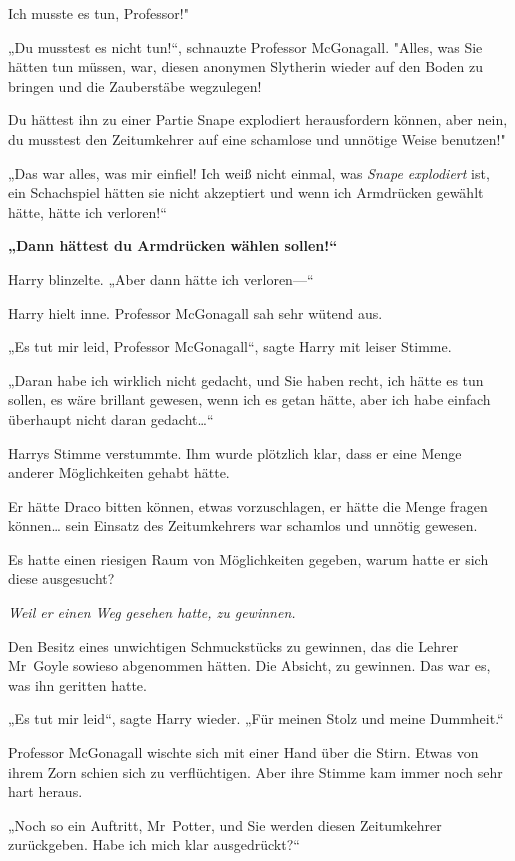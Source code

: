 {Ich musste es tun, Professor!"

„Du musstest es nicht tun!“, schnauzte Professor McGonagall. "Alles, was Sie hätten tun müssen, war, diesen anonymen Slytherin wieder auf den Boden zu bringen und die Zauberstäbe wegzulegen!

Du hättest ihn zu einer Partie Snape explodiert herausfordern können, aber nein, du musstest den Zeitumkehrer auf eine schamlose und unnötige Weise benutzen!"

„Das war alles, was mir einfiel! Ich weiß nicht einmal, was \emph{Snape explodiert} ist, ein Schachspiel hätten sie nicht akzeptiert und wenn ich Armdrücken gewählt hätte, hätte ich verloren!“

\textbf{„Dann hättest du Armdrücken wählen sollen!“}

Harry blinzelte. „Aber dann hätte ich verloren—“

Harry hielt inne. Professor McGonagall sah sehr wütend aus.

„Es tut mir leid, Professor McGonagall“, sagte Harry mit leiser Stimme.

„Daran habe ich wirklich nicht gedacht, und Sie haben recht, ich hätte es tun sollen, es wäre brillant gewesen, wenn ich es getan hätte, aber ich habe einfach überhaupt nicht daran gedacht…“

Harrys Stimme verstummte. Ihm wurde plötzlich klar, dass er eine Menge anderer Möglichkeiten gehabt hätte.

Er hätte Draco bitten können, etwas vorzuschlagen, er hätte die Menge fragen können… sein Einsatz des Zeitumkehrers war schamlos und unnötig gewesen.

Es hatte einen riesigen Raum von Möglichkeiten gegeben, warum hatte er sich diese ausgesucht?

\emph{Weil er einen Weg gesehen hatte, zu gewinnen.}

Den Besitz eines unwichtigen Schmuckstücks zu gewinnen, das die Lehrer Mr~Goyle sowieso abgenommen hätten. Die Absicht, zu gewinnen. Das war es, was ihn geritten hatte.

„Es tut mir leid“, sagte Harry wieder. „Für meinen Stolz und meine Dummheit.“

Professor McGonagall wischte sich mit einer Hand über die Stirn. Etwas von ihrem Zorn schien sich zu verflüchtigen. Aber ihre Stimme kam immer noch sehr hart heraus.

„Noch so ein Auftritt, Mr~Potter, und Sie werden diesen Zeitumkehrer zurückgeben. Habe ich mich klar ausgedrückt?“

}
